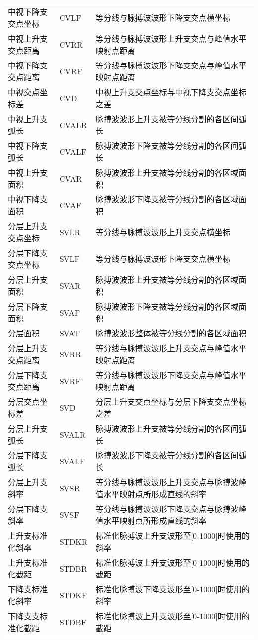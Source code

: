 \begin{center}
\begin{longtable}{m{4cm}<{\centering}m{2cm}<{\centering}m{8.5cm}<{\centering}}
        中视下降支交点坐标 & CVLF & 等分线与脉搏波波形下降支交点横坐标 \\
        中视上升支交点距离 & CVRR & 等分线与脉搏波波形上升支交点与峰值水平映射点距离 \\
        中视下降支交点距离 & CVRF & 等分线与脉搏波波形下降支交点与峰值水平映射点距离 \\
        中视交点坐标差 & CVD & 中视上升支交点坐标与中视下降支交点坐标之差 \\
        中视上升支弧长 & CVALR & 脉搏波波形上升支被等分线分割的各区间弧长 \\
        中视下降支弧长 & CVALF & 脉搏波波形下降支被等分线分割的各区间弧长 \\
        中视上升支面积 & CVAR & 脉搏波波形上升支被等分线分割的各区域面积 \\
        中视下降支面积 & CVAF & 脉搏波波形下降支被等分线分割的各区域面积 \\
        分层上升支交点坐标 & SVLR & 等分线与脉搏波波形上升支交点横坐标 \\
        分层下降支交点坐标 & SVLF & 等分线与脉搏波波形下降支交点横坐标 \\
        分层上升支面积 & SVAR & 脉搏波波形上升支被等分线分割的各区域面积 \\
        分层下降支面积 & SVAF & 脉搏波波形下降支被等分线分割的各区域面积 \\
        分层面积 & SVAT & 脉搏波波形整体被等分线分割的各区域面积 \\
        分层上升支交点距离 & SVRR & 等分线与脉搏波波形上升支交点与峰值水平映射点距离 \\
        分层下降支交点距离 & SVRF & 等分线与脉搏波波形下降支交点与峰值水平映射点距离 \\
        分层交点坐标差 & SVD &  分层上升支交点坐标与分层下降支交点坐标之差\\
        分层上升支弧长 & SVALR & 脉搏波波形上升支被等分线分割的各区间弧长 \\
        分层下降支弧长 & SVALF & 脉搏波波形下降支被等分线分割的各区间弧长 \\
        分层上升支斜率 & SVSR & 等分线与脉搏波波形上升支交点与脉搏波峰值水平映射点所形成直线的斜率\\
        分层下降支斜率 & SVSF & 等分线与脉搏波波形下降支交点与脉搏波峰值水平映射点所形成直线的斜率 \\
        上升支标准化斜率 & STDKR & 标准化脉搏波上升支波形至[0-1000]时使用的斜率 \\
        上升支标准化截距 & STDBR & 标准化脉搏波上升支波形至[0-1000]时使用的截距 \\
        下降支标准化斜率& STDKF & 标准化脉搏波下降支波形至[0-1000]时使用的斜率 \\
        下降支支标准化截距 & STDBF & 标准化脉搏波上升支波形至[0-1000]时使用的截距 \\
  \end{longtable}
\end{center}

